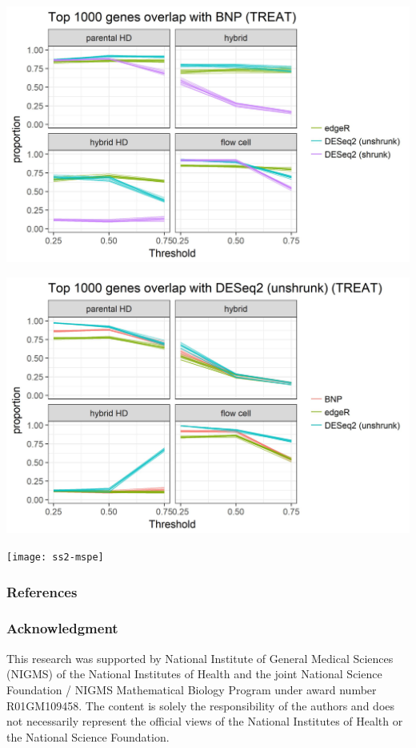 \documentclass{beamer}
\begin{document}
\begin{frame}[label=current]
\includegraphics[width=\textwidth]{overlap-ss2-bnp}
\end{frame}

\begin{frame}[label=current]
\includegraphics[width=\textwidth]{overlap-ss2-deseq}
\end{frame}

\begin{frame}[label=current]
\texttt{[image: ss2-mspe]}
\end{frame}

\begin{frame}[allowframebreaks]
  \tiny
  \frametitle{References}
  
  

\end{frame}

\begin{frame}%
  \frametitle{Acknowledgment}
  \small%
  This research was supported by National Institute of General Medical Sciences (NIGMS) of the National Institutes of Health and the joint National Science Foundation / NIGMS Mathematical Biology Program under award number R01GM109458. The content is solely the responsibility of the authors and does not necessarily represent the official views of the National Institutes of Health or the National Science Foundation.
\end{frame}
\end{document}
